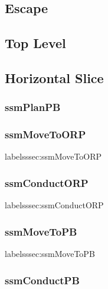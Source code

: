 \documentclass[../../main/main.tex]{subfiles}
\begin{document}
\subsection{Escape}\label{ssec:escape}

\subsection{Top Level}\label{ssec:toplevel}

\subsection{Horizontal Slice}\label{ssec:horizontalslice}

\subsubsection{ssmPlanPB}\label{sssec:ssmPlanPB}

\subsubsection{ssmMoveToORP}label{sssec:ssmMoveToORP}

\subsubsection{ssmConductORP}label{sssec:ssmConductORP}

\subsubsection{ssmMoveToPB}label{sssec:ssmMoveToPB}

\subsubsection{ssmConductPB}\label{sssec:ssmConductPB}
\end{document}
